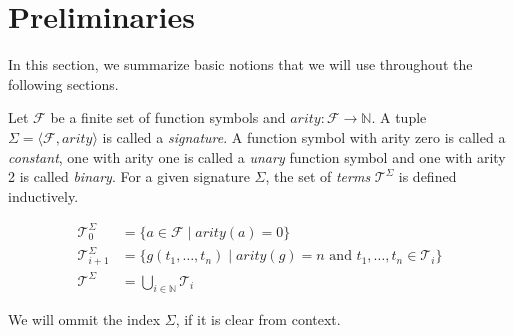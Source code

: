 \section*{Preliminaries}

In this section, we summarize basic notions that we will use throughout the following sections.

\begin{definition}[Terms]

Let $\mathcal{F}$ be a finite set of function symbols and $arity: \mathcal{F} \rightarrow \mathbb{N}$.
A tuple $\Sigma = \langle \mathcal{F}, arity \rangle$ is called a \emph{signature}.
A function symbol with arity zero is called a \emph{constant}, one with arity one is called a \emph{unary} function symbol and one with arity 2 is called \emph{binary}.
For a given signature $\Sigma$, the set of \emph{terms} $\mathcal{T}^{\Sigma}$ is defined inductively.

\begin{align*}
	\mathcal{T}^{\Sigma}_0 &= \{a \in \mathcal{F} \mid arity(a) = 0\}\\
	\mathcal{T}^{\Sigma}_{i+1} &= \{g(t_1,\ldots,t_n) \mid arity(g) = n \text{ and } t_1, \ldots, t_n \in \mathcal{T}_{i}\} \\
	\mathcal{T}^{\Sigma} &= \bigcup_{i\in \mathbb{N}} \mathcal{T}_{i}
\end{align*}

\end{definition}

We will ommit the index $\Sigma$, if it is clear from context.

